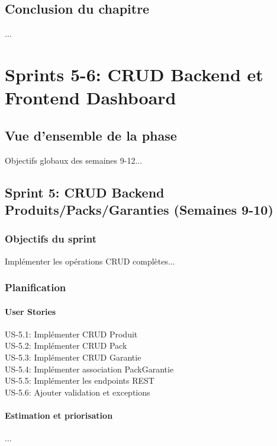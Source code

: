 \documentclass[12pt,a4paper]{report}
\begin{document}
\section{Conclusion du chapitre}
...

\chapter{Sprints 5-6: CRUD Backend et Frontend Dashboard}
\label{chap:sprints5-6}

\section{Vue d'ensemble de la phase}
Objectifs globaux des semaines 9-12...

\section{Sprint 5: CRUD Backend Produits/Packs/Garanties (Semaines 9-10)}
\subsection{Objectifs du sprint}
Implémenter les opérations CRUD complètes...

\subsection{Planification}
\subsubsection{User Stories}
US-5.1: Implémenter CRUD Produit \\
US-5.2: Implémenter CRUD Pack \\
US-5.3: Implémenter CRUD Garantie \\
US-5.4: Implémenter association PackGarantie \\
US-5.5: Implémenter les endpoints REST \\
US-5.6: Ajouter validation et exceptions

\subsubsection{Estimation et priorisation}
...
\end{document}
